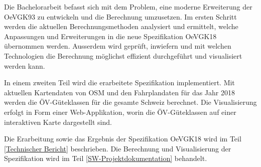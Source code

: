 Die Bachelorarbeit befasst sich mit dem Problem, eine moderne Erweiterung der \gls{OeVGK93} zu entwickeln und die Berechnung umzusetzen.
Im ersten Schritt werden die aktuellen Berechnungsmethoden analysiert und ermittelt, welche Anpassungen und Erweiterungen in die neue Spezifikation \gls{OeVGK18} übernommen werden.
Ausserdem wird geprüft, inwiefern und mit welchen Technologien die Berechnung möglichst effizient durchgeführt und visualisiert werden kann.

In einem zweiten Teil wird die erarbeitete Spezifikation implementiert.
Mit aktuellen Kartendaten von \ac{OSM} und den Fahrplandaten für das Jahr 2018 werden die \acs{ÖV}-Güteklassen für die gesamte Schweiz berechnet.
Die Visualisierung erfolgt in Form einer Web-Applikation, worin die \acs{ÖV}-Güteklassen auf einer interaktiven Karte dargestellt sind.

Die Erarbeitung sowie das Ergebnis der Spezifikation \gls{OeVGK18} wird im Teil \ref{Technischer Bericht} beschrieben.
Die Berechnung und Visualisierung der Spezifikation wird im Teil \ref{SW-Projektdokumentation} behandelt.
